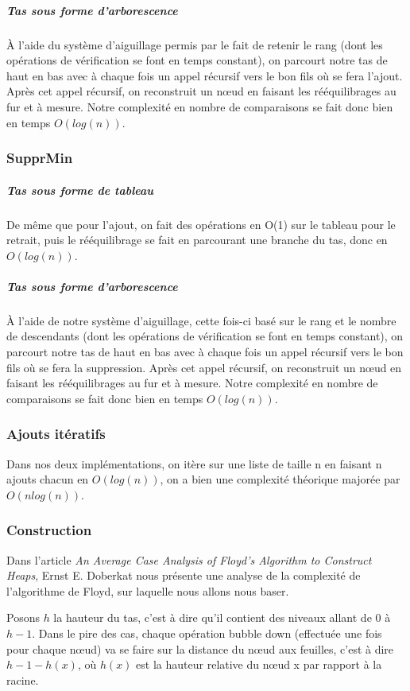 \documentclass[12pt,a4paper]{article}
\begin{document}
\subparagraph{Tas sous forme d'arborescence}

À l'aide du système d'aiguillage permis par le fait de retenir le rang (dont les opérations de vérification se font en temps constant), on parcourt notre tas de haut en bas avec à chaque fois un appel récursif vers le bon fils où se fera l'ajout. Après cet appel récursif, on reconstruit un nœud en faisant les rééquilibrages au fur et à mesure. Notre complexité en nombre de comparaisons se fait donc bien en temps $O(log (n))$. 


\subsubsection{SupprMin}

\subparagraph{Tas sous forme de tableau}

De même que pour l'ajout, on fait des opérations en O(1) sur le tableau pour le retrait, puis le rééquilibrage se fait en parcourant une branche du tas, donc en $O(log (n))$.
\subparagraph{Tas sous forme d'arborescence}


À l'aide de notre système d'aiguillage, cette fois-ci basé sur le rang et le nombre de descendants (dont les opérations de vérification se font en temps constant), on parcourt notre tas de haut en bas avec à chaque fois un appel récursif vers le bon fils où se fera la suppression. Après cet appel récursif, on reconstruit un nœud en faisant les rééquilibrages au fur et à mesure. Notre complexité en nombre de comparaisons se fait donc bien en temps $O(log (n))$. 



\subsubsection{Ajouts itératifs}

Dans nos deux implémentations, on itère sur une liste de taille n en faisant n ajouts chacun en $O( log (n))$, on a bien une complexité théorique majorée par $O(n log(n))$.
\subsubsection{Construction}

Dans l'article \textit{An Average Case Analysis of Floyd's Algorithm to Construct Heaps}\cite{Doberkat}, Ernst E. Doberkat nous présente une analyse de la complexité de l'algorithme de Floyd, sur laquelle nous allons nous baser.

Posons $h$ la hauteur du tas, c'est à dire qu'il contient des niveaux allant de $0$ à $h - 1$. Dans le pire des cas, chaque opération bubble down (effectuée une fois pour chaque nœud) va se faire sur la distance du nœud aux feuilles, c'est à dire $h - 1 - h(x)$, où $h(x)$ est la hauteur relative du nœud x par rapport à la racine.
\end{document}
